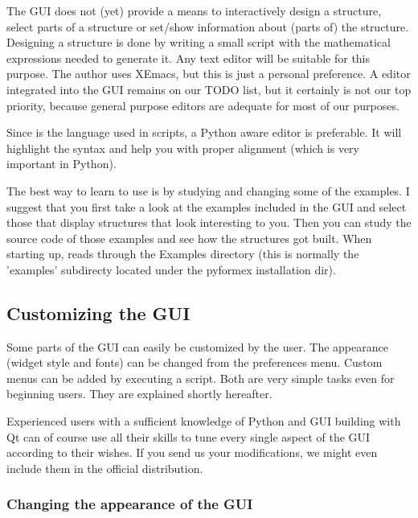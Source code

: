 The GUI does not (yet) provide a means to interactively design a structure, select parts of a structure or set/show information about (parts of) the structure. Designing a structure is done by writing a small script with the mathematical expressions needed to generate it. Any text editor will be suitable for this purpose. The author uses XEmacs, but this is just a personal preference. 
A \pyformex editor integrated into the GUI remains on our TODO list, but it certainly is not our top priority, because general purpose editors are adequate for most of our purposes. 

Since  is the language used in \pyformex scripts, a Python aware editor is preferable. It will highlight the syntax and help you with proper alignment (which is very important in Python). 
 

The best way to learn to use \pyformex is by studying and changing some of the examples. I suggest that you first take a look at the examples included in the \pyformex GUI and select those that display structures that look interesting to you. Then you can study the source code of those examples and see how the structures got built. 
When starting up, \pyformex reads through the Examples directory (this is normally the 'examples' subdirecty located under the pyformex installation dir).  


\subsection{Customizing the GUI}
\label{sec:customize-gui}

Some parts of the \pyformex GUI can easily be customized by the user. 
The appearance (widget style and fonts) can be changed from the preferences menu. Custom menus can be added by executing a script. Both are very simple tasks even for beginning users. They are explained shortly hereafter.

Experienced users with a sufficient knowledge of Python and GUI building with Qt can of course use all their skills to tune every single aspect of the \pyformex GUI according to their wishes. If you send us your modifications, we might even include them in the official distribution.


\subsubsection{Changing the appearance of the GUI}
\label{sec:chang-appe-gui}


